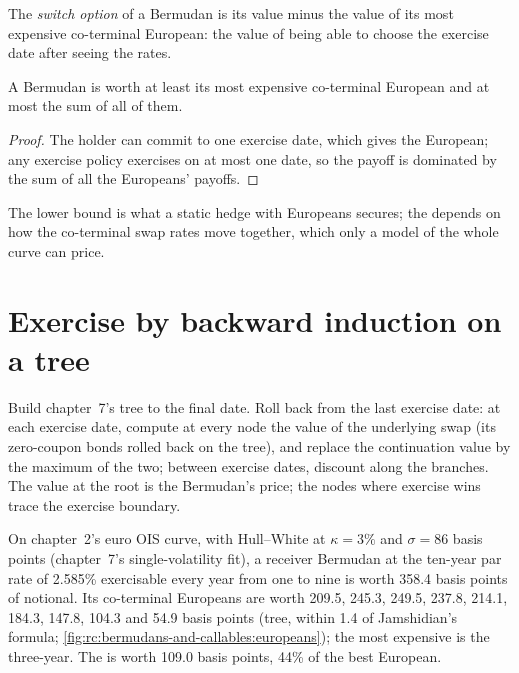 \begin{definition}\label{def:rc:bermudans-and-callables:switch}
The \emph{switch option} of a Bermudan is its value minus the
value of its most expensive co-terminal European: the value of being able to
choose the exercise date after seeing the rates.
\end{definition}

\begin{proposition}\label{prop:rc:bermudans-and-callables:bounds}
A Bermudan is worth at least its most expensive co-terminal European and at most
the sum of all of them.
\end{proposition}
\begin{proof}
The holder can commit to one exercise date, which gives the European; any
exercise policy exercises on at most one date, so the payoff is dominated by the
sum of all the Europeans' payoffs.
\end{proof}

The lower bound is what a static hedge with Europeans secures; the 
depends on how the co-terminal swap rates move together, which only a model of
the whole curve can price.

\section{Exercise by backward induction on a tree}

\begin{method}\label{met:rc:bermudans-and-callables:tree}
Build chapter~7's tree to the final date. Roll back from the last exercise date:
at each exercise date, compute at every node the value of the underlying swap
(its zero-coupon bonds rolled back on the tree), and replace the continuation
value by the maximum of the two; between exercise dates, discount along the
branches. The value at the root is the Bermudan's price; the nodes where
exercise wins trace the exercise boundary.
\end{method}

\label{lst:rc:bermudans-and-callables:tree}

\begin{example}\label{ex:rc:bermudans-and-callables:tenno}
On chapter~2's euro OIS curve, with Hull--White at $\kappa=3\%$ and $\sigma=86$ basis
points (chapter~7's single-volatility fit), a receiver Bermudan at the ten-year par
rate of 2.585\% exercisable every year from one to nine is worth 358.4 basis points
of notional. Its co-terminal Europeans are worth 209.5, 245.3, 249.5, 237.8,
214.1, 184.3, 147.8, 104.3 and 54.9 basis points (tree, within 1.4 of Jamshidian's
formula; \cref{fig:rc:bermudans-and-callables:europeans}); the most expensive is
the three-year. The  is worth 109.0 basis points, 44\% of the best
European.
\end{example}

